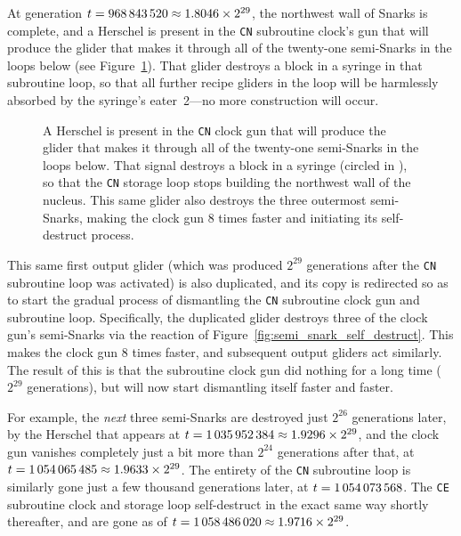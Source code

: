 At generation $t = 968{\,}843{\,}520 \approx 1.8046 \times 2^{29}$, the northwest wall of Snarks is complete, and a Herschel is present in the \texttt{CN} subroutine clock's gun that will produce the glider that makes it through all of the twenty-one semi-Snarks in the loops below (see Figure~\ref{fig:0e0p_timeline_968843520}). That glider destroys a block in a syringe in that subroutine loop, so that all further recipe gliders in the loop will be harmlessly absorbed by the syringe's eater~2---no more construction will occur.

\begin{figure}[!htb]
	\centering
	\caption{A Herschel is present in the \texttt{CN} clock gun that will produce the glider that makes it through all of the twenty-one semi-Snarks in the loops below. That signal destroys a block in a syringe (circled in ), so that the \texttt{CN} storage loop stops building the northwest wall of the nucleus. This same glider also destroys the three outermost semi-Snarks, making the clock gun $8$ times faster and initiating its self-destruct process.}
	\label{fig:0e0p_timeline_968843520}
\end{figure}


\clearpage%


This same first output glider (which was produced $2^{29}$ generations after the \texttt{CN} subroutine loop was activated) is also duplicated, and its copy is redirected so as to start the gradual process of dismantling the \texttt{CN} subroutine clock gun and subroutine loop. Specifically, the duplicated glider destroys three of the clock gun's semi-Snarks via the reaction of Figure~\ref{fig:semi_snark_self_destruct}. This makes the clock gun 8 times faster, and subsequent output gliders act similarly. The result of this is that the subroutine clock gun did nothing for a long time ($2^{29}$ generations), but will now start dismantling itself faster and faster. 

For example, the \emph{next} three semi-Snarks are destroyed just $2^{26}$ generations later, by the Herschel that appears at $t = 1{\,}035{\,}952{\,}384 \approx 1.9296 \times 2^{29}$, and the clock gun vanishes completely just a bit more than $2^{24}$ generations after that, at $t = 1{\,}054{\,}065{\,}485 \approx 1.9633 \times 2^{29}$. The entirety of the \texttt{CN} subroutine loop is similarly gone just a few thousand generations later, at $t = 1{\,}054{\,}073{\,}568$. The \texttt{CE} subroutine clock and storage loop self-destruct in the exact same way shortly thereafter, and are gone as of $t = 1{\,}058{\,}486{\,}020 \approx 1.9716 \times 2^{29}$.

